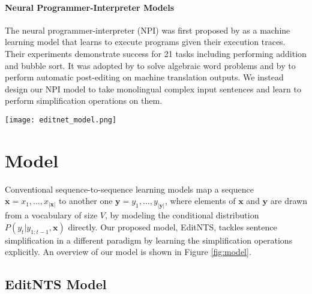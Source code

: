 \documentclass[11pt,a4paper]{article}
\def\editnet{EditNTS}
\begin{document}
\paragraph{Neural Programmer-Interpreter Models}
The neural programmer-interpreter (NPI) was first proposed by \citet{reed2016neural} as a machine learning model that learns to execute programs given their execution traces. Their experiments demonstrate success for 21 tasks including performing addition and bubble sort.  It was adopted by \citet{ling2017program} to solve algebraic word
problems and by \citet{berard2017lig, vu2018automatic} to perform automatic post-editing on machine translation outputs. 
We instead design our NPI model to take monolingual complex input sentences and learn to perform simplification operations on them.


\begin{figure*}[h]
\centering
\texttt{[image: editnet\_model.png]}
\caption{Our model contains two parts: the programmer and the interpreter. At time step $t$, the programmer predicts an edit operation $z_t$ on the complex word $x_{k_t}$ by considering the interpreter-generated words $y_{1:j_{t-1}}$,  programmer-generated edit labels $z_{1:t-1}$, and a context vector $c_t$ obtained by attending over all words in the complex sentence. The interpreter executes the edit operation $z_t$  to generate the simplified token $y_{j_{t}}$  and provides the interpreter context $y_{1:j_{t}}$ to the programmer for the next decision. }
\label{fig:model}
\end{figure*}


\section{Model}
Conventional sequence-to-sequence learning models map a sequence $\mathbf{x}=x_1, \ldots, x_{\mathbf{|x|}} $ to another one $\mathbf{y}=y_1, \ldots, y_{|\mathbf{y}|}$, where elements of $\mathbf{x}$ and $\mathbf{y}$ are drawn from a vocabulary of size $V$, by modeling the conditional distribution $P(y_t|y_{1:t-1}, \mathbf{x})$ directly.
Our proposed model, \editnet{}, tackles sentence simplification in a different paradigm by learning the simplification operations explicitly. An overview of our model is shown in Figure \ref{fig:model}.
\subsection{EditNTS Model}
\label{sec:editNTS}
\end{document}
